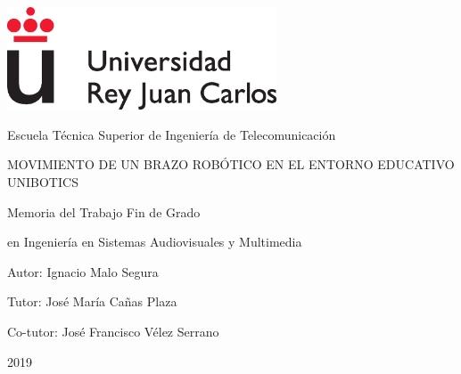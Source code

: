 \documentclass[12pt,spanish,chapterprefix, numbers=noenddot]{book}
\numberwithin{equation}{section}
\numberwithin{figure}{section}
\begin{document}
\frontmatter

\begin{titlepage}

\begin{center}
\includegraphics[width=8cm]{Figs/logoURJC}
\par\end{center}

\begin{center}
Escuela Técnica Superior de Ingeniería de Telecomunicación
\par\end{center}

\vspace{4cm}

\begin{center}
{\LARGE{}MOVIMIENTO DE UN BRAZO ROBÓTICO EN EL ENTORNO EDUCATIVO UNIBOTICS}{\LARGE\par}
\par\end{center}

\vspace{4cm}

\begin{center}
{\large{}Memoria del Trabajo Fin de Grado}{\large\par}
\par\end{center}

\begin{center}
{\large{}en Ingeniería en Sistemas Audiovisuales y Multimedia}{\large\par}
\par\end{center}

\vspace{4cm}

\begin{center}
{\large{}Autor: Ignacio Malo Segura}{\large\par}
\par\end{center}

\begin{center}
{\large{}Tutor: José María Cañas Plaza}{\large\par}
\par\end{center}

\begin{center}
{\large{}Co-tutor: José Francisco Vélez Serrano}{\large\par}
\par\end{center}

\begin{center}
2019
\par\end{center}

\end{titlepage}
\end{document}

